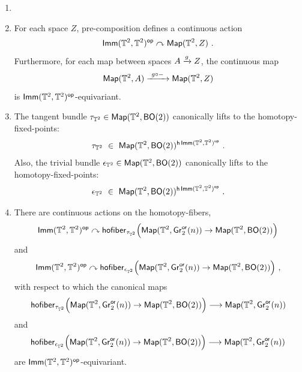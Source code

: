 \begin{prop}
\label{a1}
\begin{enumerate}
\item[]

\item
For each space $Z$, pre-composition defines a continuous action \[\Imm(\TT^2,\TT^2)^{\op} 
\curvearrowright
\Map( \TT^2 , Z)~.\]
Furthermore, for each map between spaces $A \xra{g} Z$, the continuous map 
\[
\Map( \TT^2 , A )
\xra{~g\circ -~}
\Map( \TT^2 , Z )
\]
is $\Imm(\TT^2,\TT^2)^{\op}$-equivariant.



\item
The tangent bundle $\tau_{\TT^2} \in \Map( \TT^2 , {\sf BO}(2))$ canonically lifts to the homotopy-fixed-points:
\[
\tau_{\TT^2}
~\in~
\Map( \TT^2 , {\sf BO}(2))^{{\sf h} \Imm(\TT^2,\TT^2)^{\op}}
~.
\]
Also, the trivial bundle $\epsilon_{\TT^2} \in \Map( \TT^2 , {\sf BO}(2))$ canonically lifts to the homotopy-fixed-points:
\[
\epsilon_{\TT^2}
~\in~
\Map( \TT^2 , {\sf BO}(2))^{{\sf h} \Imm(\TT^2,\TT^2)^{\op}}
~.
\]


\item
There are continuous actions on the homotopy-fibers,
\[
\Imm(\TT^2,\TT^2)^{\op}
\curvearrowright
{\sf hofiber}_{\tau_{\TT^2}}
\Bigl(
\Map( \TT^2 , {\sf Gr}^{\sf or}_2(n) )
\to
\Map( \TT^2 , {\sf BO}(2))
\Bigr)
\]
and
\[
\Imm(\TT^2,\TT^2)^{\op}
\curvearrowright
{\sf hofiber}_{\epsilon_{\TT^2}}
\Bigl(
\Map( \TT^2 , {\sf Gr}^{\sf or}_2(n) )
\to
\Map( \TT^2 , {\sf BO}(2))
\Bigr)
~,
\]
with respect to which the canonical maps 
\[
{\sf hofiber}_{\tau_{\TT^2}}
\Bigl(
\Map( \TT^2 , {\sf Gr}^{\sf or}_2(n) )
\to
\Map( \TT^2 , {\sf BO}(2))
\Bigr)
\longrightarrow
\Map( \TT^2 , {\sf Gr}^{\sf or}_2(n) )
\]
and
\[
{\sf hofiber}_{\epsilon_{\TT^2}}
\Bigl(
\Map( \TT^2 , {\sf Gr}^{\sf or}_2(n) )
\to
\Map( \TT^2 , {\sf BO}(2))
\Bigr)
\longrightarrow
\Map( \TT^2 , {\sf Gr}^{\sf or}_2(n) )
\]
are $\Imm(\TT^2,\TT^2)^{\op}$-equivariant.

\end{enumerate}

\end{prop}

